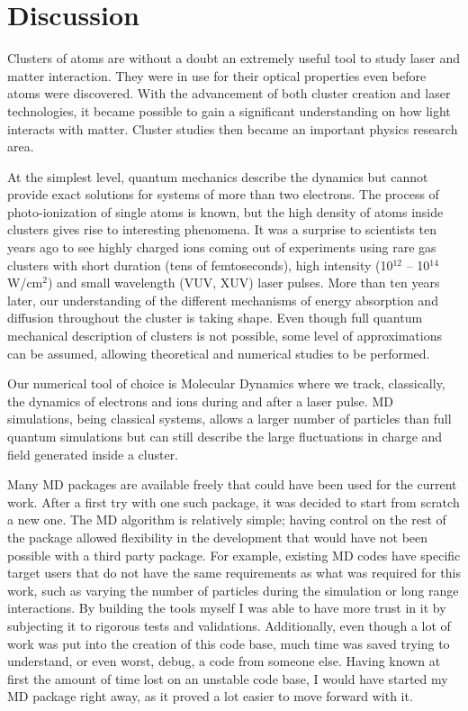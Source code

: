 \section{Discussion}

Clusters of atoms are without a doubt an extremely useful tool to study
laser and matter interaction. They were in use for their optical properties
even before atoms were discovered. With the advancement of both cluster creation
and laser technologies, it became possible to gain a significant understanding
on how light interacts with matter. Cluster studies then became an important
physics research area.

At the simplest level, quantum mechanics describe the dynamics but cannot provide
exact solutions for systems of more than two electrons.
The process of photo-ionization of single atoms is known, but the high density
of atoms inside clusters gives rise to interesting phenomena. It was a surprise
to scientists ten years ago to see highly charged ions coming out of experiments
using rare gas clusters with short duration (tens of femtoseconds), high intensity
(10$^{12}$ -- 10$^{14}$ W/cm$^2$) and small wavelength (VUV, XUV) laser pulses.
More than ten years later, our understanding of the different mechanisms of energy
absorption and diffusion throughout the cluster is taking shape. Even though full
quantum mechanical description of clusters is not possible, some level of approximations
can be assumed, allowing theoretical and numerical studies to be performed.

Our numerical tool of choice is Molecular Dynamics where we track, classically,
the dynamics of electrons and ions during and after a laser pulse. MD simulations,
being classical systems, allows a larger number of particles than full quantum
simulations but can still describe the large fluctuations in charge and field
generated inside a cluster.

Many MD packages are available freely that could have been used for
the current work. After a first try with one such package, it was decided to
start from scratch a new one. The MD algorithm is relatively simple; having
control on the rest of the package allowed flexibility in the development that
would have not been possible with a third party package. For example, existing
MD codes have specific target users that do not have the same requirements as what
was required for this work, such as varying the number of particles during the
simulation or long range interactions. By building the tools myself I was able
to have more trust in it by subjecting it to rigorous tests and validations.
Additionally, even though a lot of work was put into the creation of this code
base, much time was saved trying to understand, or even worst, debug, a code from
someone else. Having known at first the amount of time lost on an unstable code
base, I would have started my MD package right away, as it proved a lot easier
to move forward with it.


